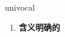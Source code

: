 
\begin{frame}
{\huge univocal}
\begin{center}
\begin{enumerate}\Large
  \item \textbf{含义明确的}
\end{enumerate}
\end{center}
\end{frame}

